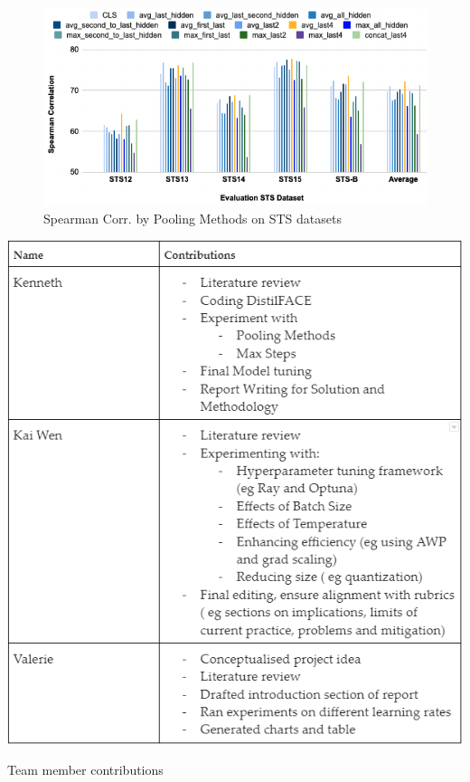 \documentclass[10pt,twocolumn,letterpaper]{article}
\begin{document}
\begin{appendices}
\begin{figure}[hbt!]
\centering
\includegraphics[scale=0.35]{images/Results-Evaluation-Score-by-Pooling-Methods.png}
\caption{Spearman Corr. by Pooling Methods on STS datasets}
\label{fig:short}
\end{figure}

\begin{table}[hbt!]
\includegraphics[scale=0.57]{images/Contributions.png}
\caption{Team member contributions}
\label{fig:short}
\end{table}

\end{appendices}
\end{document}
